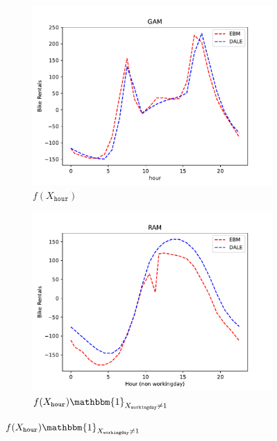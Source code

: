 \documentclass[runningheads]{llncs}
\newcommand{\when}[1]{\mathbbm{1}_{#1}}
\begin{document}
\begin{figure}[htbp]
    \centering
    \begin{subfigure}{0.32\textwidth}
        \centering
        \includegraphics[width=\textwidth]{figures/bike_rentals_gam}
        \caption{\(f(X_{\mathtt{hour}})\)}
        \label{subfig:bike_rentals_gam}
    \end{subfigure}
    \begin{subfigure}{0.32\textwidth}
        \centering
        \includegraphics[width=\textwidth]{figures/bike_rentals_ram_1}
        \caption{\(f(X_{\mathtt{hour}}) \when{X_{\mathtt{workingday}} \neq 1}\)}
        \label{subfig:bike_rentals_regional_gam_1}
    \end{subfigure}

\end{figure}
\end{document}
